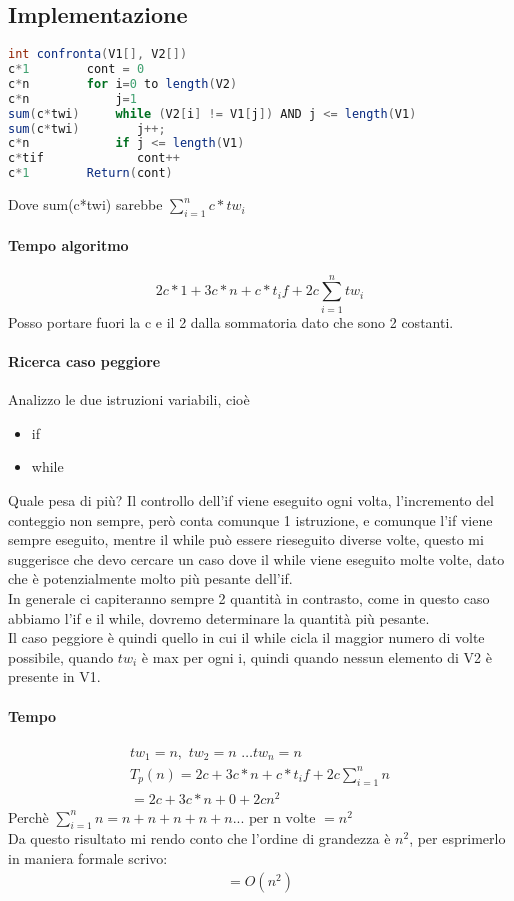 \subsection{Implementazione}
\begin{lstlisting}[language=Java]
    int confronta(V1[], V2[])
c*1        cont = 0
c*n        for i=0 to length(V2)
c*n            j=1
sum(c*twi)     while (V2[i] != V1[j]) AND j <= length(V1)
sum(c*twi)        j++;
c*n            if j <= length(V1)
c*tif             cont++
c*1        Return(cont)
\end{lstlisting}
Dove sum(c*twi) sarebbe $\sum_{i=1}^n{c*tw_i}$\\
\paragraph*{Tempo algoritmo}
\begin{equation*}
    2c*1 + 3c*n + c*t_if + 2c \sum_{i=1}^n{tw_i}
\end{equation*}
Posso portare fuori la c e il 2 dalla sommatoria dato che sono 2 costanti.
\paragraph*{Ricerca caso peggiore}
Analizzo le due istruzioni variabili, cioè
\begin{itemize}
    \item if
    \item while
\end{itemize}
Quale pesa di più? Il controllo dell'if viene eseguito ogni volta, l'incremento del conteggio non sempre, però conta comunque
1 istruzione, e comunque l'if viene sempre eseguito, mentre il while può essere rieseguito
diverse volte, questo mi suggerisce che devo cercare un caso dove
il while viene eseguito molte volte, dato che è potenzialmente molto più pesante dell'if.\\
In generale ci capiteranno sempre 2 quantità in contrasto, come in questo caso abbiamo l'if e il while, dovremo
determinare la quantità più pesante.\\
Il caso peggiore è quindi quello in cui il while cicla il maggior numero di volte possibile, quando $tw_i$ è max per
ogni i, quindi quando nessun elemento di V2 è presente in V1.\\
\paragraph*{Tempo}
\begin{align*}
    tw_1=n, \,\, tw_2=n \,\, \dots tw_n=n\\
    T_p(n) = 2c+3c*n+c*t_if+2c\sum_{i=1}^n{n}\\
    =2c+3c*n+0+2cn^2
\end{align*}
Perchè $\sum_{i=1}^n{n}=n+n+n+n+n ... \,\, \text{per n volte } = n^2$\\
Da questo risultato mi rendo conto che l'ordine di grandezza è $n^2$, per esprimerlo
in maniera formale scrivo:
\begin{align*}
    = O(n^2)
\end{align*}
